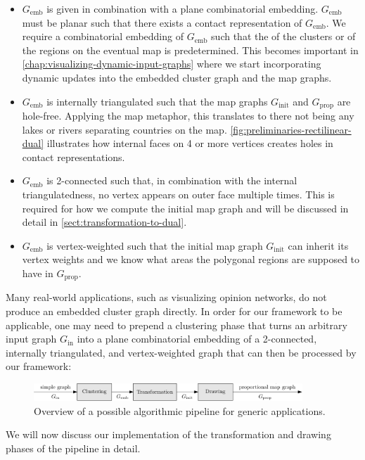 \begin{itemize}
	\item $G_\text{emb}$ is given in combination with a plane combinatorial embedding. $G_\text{emb}$ must be planar such that there exists a contact representation of $G_\text{emb}$. We require a combinatorial embedding of $G_\text{emb}$ such that the  of the clusters or of the regions on the eventual map is predetermined. This becomes important in \cref{chap:visualizing-dynamic-input-graphs} where we start incorporating dynamic updates into the embedded cluster graph and the map graphs.
	\item $G_\text{emb}$ is internally triangulated such that the map graphs $G_\text{init}$ and $G_\text{prop}$ are hole-free. Applying the map metaphor, this translates to there not being any lakes or rivers separating countries on the map. \cref{fig:preliminaries-rectilinear-dual} illustrates how internal faces on 4 or more vertices creates holes in contact representations.
	\item $G_\text{emb}$ is 2-connected such that, in combination with the internal triangulatedness, no vertex appears on outer face multiple times. This is required for how we compute the initial map graph and will be discussed in detail in \cref{sect:transformation-to-dual}.
	\item $G_\text{emb}$ is vertex-weighted such that the initial map graph $G_\text{init}$ can inherit its vertex weights and we know what areas the polygonal regions are supposed to have in $G_\text{prop}$.
\end{itemize}

Many real-world applications, such as visualizing opinion networks, do not produce an embedded cluster graph directly. In order for our framework to be applicable, one may need to prepend a clustering phase that turns an arbitrary input graph $G_\text{in}$ into a plane combinatorial embedding of a 2-connected, internally triangulated, and vertex-weighted graph that can then be processed by our framework:
%
\begin{figure}[H]
	\centering\includegraphics[width=0.9\textwidth]{Resources/Pipeline-Application-Static.pdf}
	\caption{Overview of a possible algorithmic pipeline for generic applications.}
	\label{fig:static-pipeline-application}
\end{figure}

We will now discuss our implementation of the transformation and drawing phases of the pipeline in detail.

\clearpage


\clearpage


